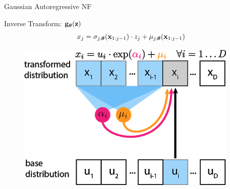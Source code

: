 \documentclass{beamer}
\begin{document}
\begin{frame}{Gaussian Autoregressive NF}
	\begin{minipage}[t]{0.65\columnwidth}
		\begin{block}{Inverse Transform: $\mathbf{g}_{\boldsymbol{\theta}}(\mathbf{z})$}
			\vspace{-0.5cm}
			\[
			x_j = \sigma_{j, \boldsymbol{\theta}} (\mathbf{x}_{1:j-1}) \cdot z_j + \mu_{j, \boldsymbol{\theta}}(\mathbf{x}_{1:j-1})
			\]
		\end{block}
	\end{minipage}%
	\begin{minipage}[t]{0.35\columnwidth}
		\begin{figure}[h]
			\centering
			\includegraphics[width=.9\linewidth]{figs/af_iaf_explained_1.png}
		\end{figure}
	\end{minipage}
\end{frame}
\end{document}
